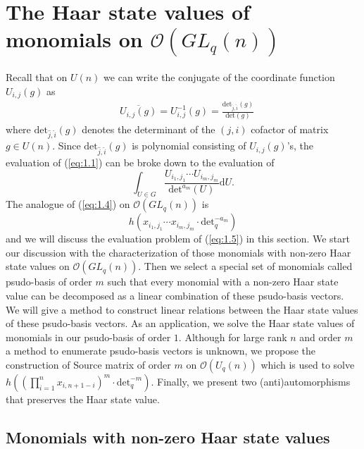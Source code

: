 \documentclass[table,a4paper,reqno]{amsart}
\numberwithin{equation}{section}
\theoremstyle{definition}
\begin{document}
\section{The Haar state values of monomials on $\mathcal{O}(GL_q(n))$}
Recall that on $U(n)$ we can write the conjugate of the coordinate function $U_{i,j}(g)$ as
\begin{equation}
    \begin{split}
        &\overline{U_{i,j}(g)}=U^{-1}_{i,j}(g)=\frac{\text{det}_{\hat{j},\hat{i}}(g)}{\text{det}(g)}
    \end{split}
\end{equation}
where $\text{det}_{\hat{j},\hat{i}}(g)$ denotes the determinant of the $(j,i)$ cofactor of matrix $g\in U(n)$. Since $\text{det}_{\hat{j},\hat{i}}(g)$ is polynomial consisting of $U_{i,j}(g)$'s, the evaluation of (\ref{eq:1.1}) can be broke down to the evaluation of 
\begin{equation}\label{eq:1.4}
    \int_{U\in G}\frac{U_{i_1,j_1}\cdots U_{i_m,j_m}}{\text{det}^{a_m}(U)}\text{d}U.
\end{equation}
The analogue of (\ref{eq:1.4}) on $\mathcal{O}(GL_q(n))$ is 
\begin{equation}\tag{1.5}
    h(x_{i_1,j_1}\cdots x_{i_m,j_m}\cdot \text{det}_q^{-a_m})
\end{equation}
and we will discuss the evaluation problem of (\ref{eq:1.5}) in this section. We start our discussion with the characterization of those monomials with non-zero Haar state values on $\mathcal{O}(GL_q(n))$. Then we select a special set of monomials called psudo-basis of order $m$ such that every monomial with a non-zero Haar state value can be decomposed as a linear combination of these psudo-basis vectors. We will give a method to construct linear relations between the Haar state values of these psudo-basis vectors. As an application, we solve the Haar state values of monomials in our psudo-basis of order $1$. Although for large rank $n$ and order $m$ a method to enumerate psudo-basis vectors is unknown, we propose the construction of Source matrix of order $m$ on $\mathcal{O}(U_q(n))$ which is used to solve $h\left((\prod_{i=1}^nx_{i,n+1-i})^m\cdot \text{det}_q^{-m}\right)$. Finally, we present two (anti)automorphisms that preserves the Haar state value.

\subsection{Monomials with non-zero Haar state values}
\end{document}
